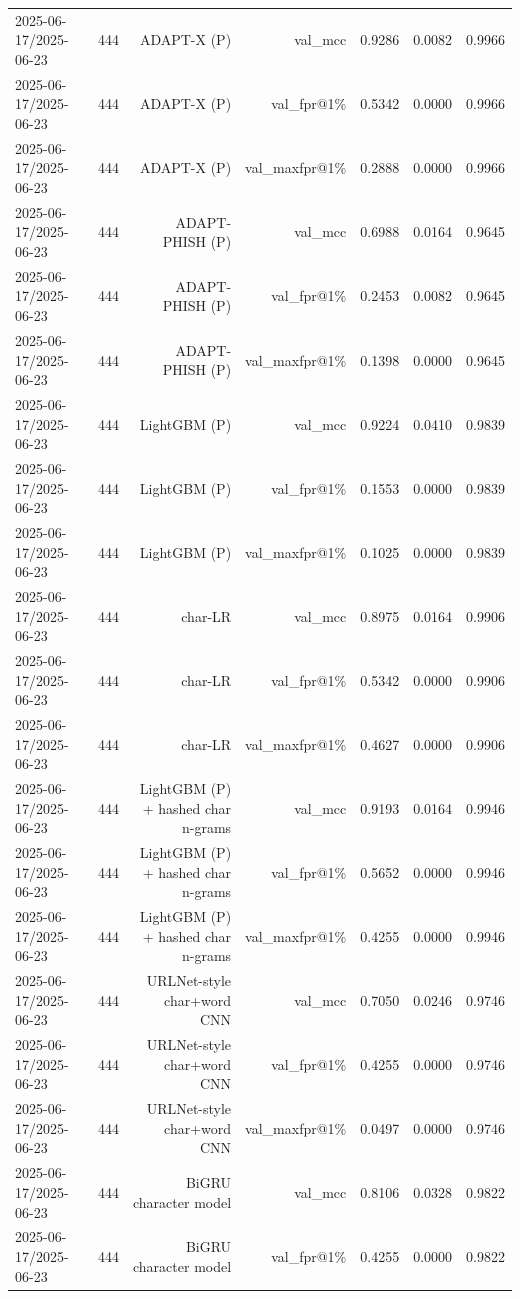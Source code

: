 \begin{table}[t]
\begin{tabular}{llrrrrr}
2025-06-17/2025-06-23 & 444 & ADAPT-X (P) & val\_mcc & 0.9286 & 0.0082 & 0.9966 \\
2025-06-17/2025-06-23 & 444 & ADAPT-X (P) & val\_fpr@1\% & 0.5342 & 0.0000 & 0.9966 \\
2025-06-17/2025-06-23 & 444 & ADAPT-X (P) & val\_maxfpr@1\% & 0.2888 & 0.0000 & 0.9966 \\
2025-06-17/2025-06-23 & 444 & ADAPT-PHISH (P) & val\_mcc & 0.6988 & 0.0164 & 0.9645 \\
2025-06-17/2025-06-23 & 444 & ADAPT-PHISH (P) & val\_fpr@1\% & 0.2453 & 0.0082 & 0.9645 \\
2025-06-17/2025-06-23 & 444 & ADAPT-PHISH (P) & val\_maxfpr@1\% & 0.1398 & 0.0000 & 0.9645 \\
2025-06-17/2025-06-23 & 444 & LightGBM (P) & val\_mcc & 0.9224 & 0.0410 & 0.9839 \\
2025-06-17/2025-06-23 & 444 & LightGBM (P) & val\_fpr@1\% & 0.1553 & 0.0000 & 0.9839 \\
2025-06-17/2025-06-23 & 444 & LightGBM (P) & val\_maxfpr@1\% & 0.1025 & 0.0000 & 0.9839 \\
2025-06-17/2025-06-23 & 444 & char-LR & val\_mcc & 0.8975 & 0.0164 & 0.9906 \\
2025-06-17/2025-06-23 & 444 & char-LR & val\_fpr@1\% & 0.5342 & 0.0000 & 0.9906 \\
2025-06-17/2025-06-23 & 444 & char-LR & val\_maxfpr@1\% & 0.4627 & 0.0000 & 0.9906 \\
2025-06-17/2025-06-23 & 444 & LightGBM (P) + hashed char n-grams & val\_mcc & 0.9193 & 0.0164 & 0.9946 \\
2025-06-17/2025-06-23 & 444 & LightGBM (P) + hashed char n-grams & val\_fpr@1\% & 0.5652 & 0.0000 & 0.9946 \\
2025-06-17/2025-06-23 & 444 & LightGBM (P) + hashed char n-grams & val\_maxfpr@1\% & 0.4255 & 0.0000 & 0.9946 \\
2025-06-17/2025-06-23 & 444 & URLNet-style char+word CNN & val\_mcc & 0.7050 & 0.0246 & 0.9746 \\
2025-06-17/2025-06-23 & 444 & URLNet-style char+word CNN & val\_fpr@1\% & 0.4255 & 0.0000 & 0.9746 \\
2025-06-17/2025-06-23 & 444 & URLNet-style char+word CNN & val\_maxfpr@1\% & 0.0497 & 0.0000 & 0.9746 \\
2025-06-17/2025-06-23 & 444 & BiGRU character model & val\_mcc & 0.8106 & 0.0328 & 0.9822 \\
2025-06-17/2025-06-23 & 444 & BiGRU character model & val\_fpr@1\% & 0.4255 & 0.0000 & 0.9822 \\

\end{tabular}
\end{table}
